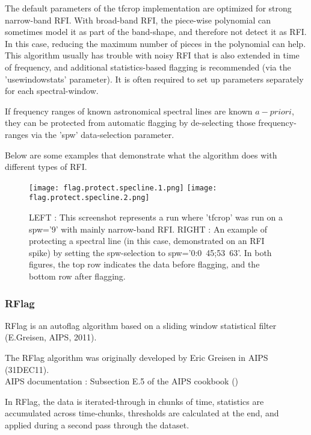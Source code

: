 The default parameters of the tfcrop implementation are optimized for strong narrow-band RFI.
With broad-band RFI, the piece-wise polynomial can sometimes model it as part of the
band-shape, and therefore not detect it as RFI.  In this case, reducing the maximum number 
of pieces in the polynomial can help.     This algorithm usually has trouble with
noisy RFI that is also extended in time of frequency, and additional statistics-based
flagging is recommended (via the 'usewindowstats' parameter).    It is often required to
set up parameters separately for each spectral-window.

If frequency ranges of known astronomical spectral lines are known $a-priori$, they can
be protected from automatic flagging by de-selecting those frequency-ranges via the 
'spw' data-selection parameter. 

Below are some examples that demonstrate what the algorithm does with different types
of RFI.

\begin{figure}
\texttt{[image: flag.protect.specline.1.png]}
\texttt{[image: flag.protect.specline.2.png]}
\caption{LEFT : This screenshot represents a run where 'tfcrop' was run on a spw='9' with mainly narrow-band RFI.  RIGHT : An example of protecting a spectral line (in this case, demonstrated on an RFI spike) by setting the spw-selection to spw='0:0~45;53~63'.   In both figures, the top row indicates the data before flagging, and the bottom row after flagging.}
\end{figure}



\subsubsection{RFlag}

RFlag is an autoflag algorithm based on a sliding window statistical filter (E.Greisen, AIPS, 2011).

The RFlag algorithm was originally developed by Eric Greisen in AIPS (31DEC11). \\
AIPS documentation : Subsection E.5 of the AIPS cookbook ()

In RFlag, the data is iterated-through in chunks
of time, statistics are accumulated across time-chunks, thresholds are calculated
at the end, and applied during a second pass through the dataset. 

